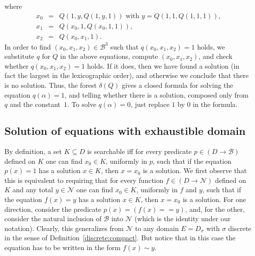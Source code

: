 \documentclass{LMCS}
\renewcommand{\d}{\delta}
\newcommand{\pN}{\mathcal{N}}
\newcommand{\pBool}{\mathcal{B}}
\newcommand{\True}{1}\newcommand{\False}{0}\newcommand{\domain}[1]{{\D_{#1}}}
\newcommand{\D}{D}
\begin{document}
where
\begin{eqnarray*}
x_0 & = & \text{$Q(\True,y,Q(\True,y,\True))$ with $y  = Q(\True,\True,Q(\True,\True,\True))$,}\\
x_1 & = & Q(x_0,\True,Q(x_0,\True,\True)), \\
x_2 & = & Q(x_0,x_1,\True).
\end{eqnarray*}
In order to find $(x_0, x_1, x_2) \in \pBool^3$ such that $q(x_0, x_1,
x_2)=\True$ holds, we substitute $q$ for $Q$ in the above equations,
compute $(x_0, x_1, x_2)$, and check whether $q(x_0, x_1, x_2)=\True$
holds. If it does, then we have found a solution (in fact the largest
in the lexicographic order), and otherwise we conclude that there is
no solution.  Thus, the forest $\d(Q)$ gives a closed formula for
solving the equation $q(\alpha)=1$, and telling whether there is a
solution, composed only from $q$ and the constant~$1$.  To solve
$q(\alpha)=0$, just replace $1$ by $0$ in the formula.

\subsection{Solution of equations with exhaustible domain}

By definition, a set $K \subseteq D$ is searchable iff for every
predicate $p \in (D \to \pBool)$ defined on $K$ one can find $x_0 \in
K$, uniformly in $p$, such that if the equation $p(x)=\True$ has a
solution $x \in K$, then $x=x_0$ is a solution.  We first observe that
this is equivalent to requiring that for every function $f \in (D \to
\pN)$ defined on $K$ and any total $y \in \pN$ one can find $x_0 \in
K$, uniformly in $f$ and $y$, such that if the equation $f(x)=y$ has a
solution $x \in K$, then $x=x_0$ is a solution. For one direction,
consider the predicate $p(x) = (f(x) == y)$, and, for the other,
consider the natural inclusion of $\pBool$ into $\pN$ (which is the
identity under our notation). Clearly, this generalizes from $\pN$ to
any domain $E=D_{\sigma}$ with $\sigma$ discrete in the sense of
Definition~\ref{discrete:compact}. But notice that in this case the
equation has to be written in the form $f(x) \sim y$.
\end{document}
